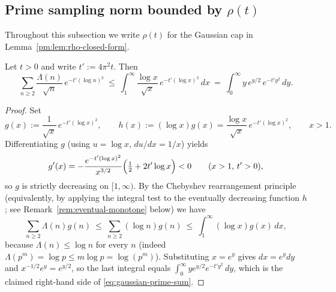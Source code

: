 \subsection{Prime sampling norm bounded by \texorpdfstring{$\rho(t)$}{ρ(t)}}

Throughout this subsection we write $\rho(t)$ for the Gaussian cap in Lemma~\ref{pm:lem:rho-closed-form}.

\begin{lemma}\label{pm:lem:sum-to-rho}
Let $t>0$ and write $t' := 4\pi^2 t$. Then
\begin{equation}\label{eq:gaussian-prime-sum}
  \sum_{n\ge 2}\frac{\Lambda(n)}{\sqrt n}\,e^{-t'(\log n)^2}
  \ \le\
  \int_{1}^{\infty}\frac{\log x}{\sqrt x}\,e^{-t'(\log x)^2}\,dx
  \ =\
  \int_{0}^{\infty} y\,e^{y/2}\,e^{-t' y^2}\,dy.
\end{equation}
\end{lemma}

\begin{proof}
Set
\begin{equation}\label{eq:Prime_norm_leq_rho-formula-9}
  g(x):=\frac{1}{\sqrt{x}}\,e^{-t'(\log x)^2},\qquad
  h(x):=(\log x)g(x)=\frac{\log x}{\sqrt{x}}\,e^{-t'(\log x)^2},\qquad x>1.
\end{equation}
Differentiating $g$ (using $u=\log x$, $du/dx = 1/x$) yields
\begin{equation}\label{eq:Prime_norm_leq_rho-formula-8}
  g'(x) = -\frac{e^{-t'(\log x)^2}}{x^{3/2}}\Bigl(\tfrac12 + 2t'\log x\Bigr) < 0\qquad(x>1,\,t'>0),
\end{equation}
so $g$ is strictly decreasing on $[1,\infty)$. By the Chebyshev rearrangement principle (equivalently, by applying the integral test to the eventually decreasing function $h$; see Remark~\ref{rem:eventual-monotone} below) we have
\begin{equation}\label{eq:Prime_norm_leq_rho-formula-7}
  \sum_{n\ge 2}\Lambda(n) g(n)
  \ \le\ \sum_{n\ge 2}(\log n) g(n)
  \ \le\ \int_{1}^{\infty}(\log x) g(x)\,dx,
\end{equation}
because $\Lambda(n)\le \log n$ for every $n$ (indeed $\Lambda(p^m)=\log p \le m\log p = \log(p^m)$).
Substituting $x=e^{y}$ gives $dx=e^{y}dy$ and $x^{-1/2}e^{y}=e^{y/2}$, so the last integral equals $\int_{0}^{\infty} y e^{y/2} e^{-t' y^2}\,dy$, which is the claimed right-hand side of \eqref{eq:gaussian-prime-sum}.
\end{proof}


